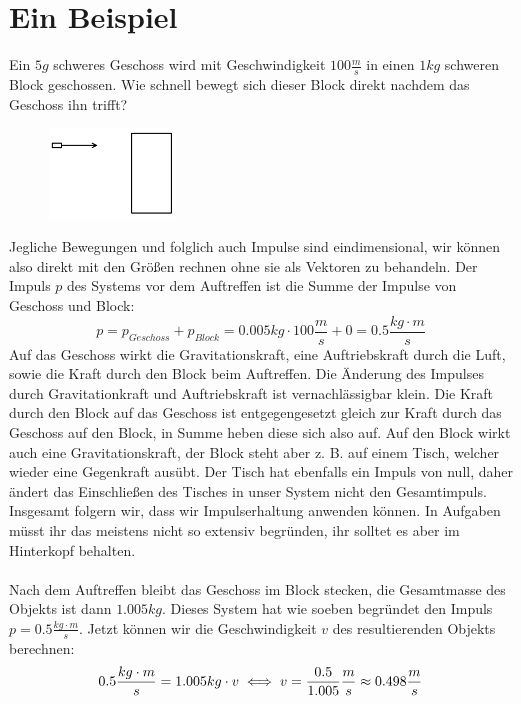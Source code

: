 \documentclass[11pt]{article}
\begin{document}
\section{Ein Beispiel}
Ein $5g$ schweres Geschoss wird mit Geschwindigkeit $100\frac{m}{s}$ in einen $1kg$ schweren Block geschossen. Wie schnell bewegt sich dieser Block direkt nachdem das Geschoss ihn trifft? 
\begin{figure}[H]
    \centering
        \includegraphics[width=0.3\textwidth]{impuls-geschoss.png}
\end{figure} 
Jegliche Bewegungen und folglich auch Impulse sind eindimensional, wir können also direkt mit den Größen rechnen ohne sie als Vektoren zu behandeln. Der Impuls $p$ des Systems vor dem Auftreffen ist die Summe der Impulse von Geschoss und Block: 
\begin{equation*}
    p = p_{Geschoss} + p_{Block} = 0.005kg \cdot 100 \frac{m}{s} + 0 = 0.5 \frac{kg\cdot m}{s}
\end{equation*}
Auf das Geschoss wirkt die Gravitationskraft, eine Auftriebskraft durch die Luft, sowie die Kraft durch den Block beim Auftreffen. Die Änderung des Impulses durch Gravitationkraft und Auftriebskraft ist vernachlässigbar klein. Die Kraft durch den Block auf das Geschoss ist entgegengesetzt gleich zur Kraft durch das Geschoss auf den Block, in Summe heben diese sich also auf. Auf den Block wirkt auch eine Gravitationskraft, der Block steht aber z. B. auf einem Tisch, welcher wieder eine Gegenkraft ausübt. Der Tisch hat ebenfalls ein Impuls von null, daher ändert das Einschließen des Tisches in unser System nicht den Gesamtimpuls. Insgesamt folgern wir, dass wir Impulserhaltung anwenden können. In Aufgaben müsst ihr das meistens nicht so extensiv begründen, ihr solltet es aber im Hinterkopf behalten. \\\\
Nach dem Auftreffen bleibt das Geschoss im Block stecken, die Gesamtmasse des Objekts ist dann $1.005kg$. Dieses System hat wie soeben begründet den Impuls $p = 0.5 \frac{kg\cdot m}{s}$. Jetzt können wir die Geschwindigkeit $v$ des resultierenden Objekts berechnen: 
\begin{equation*}
    0.5 \frac{kg\cdot m}{s} = 1.005kg \cdot v \\
    \iff v = \frac{0.5}{1.005} \frac{m}{s} \approx 0.498 \frac{m}{s}
\end{equation*}
\end{document}
